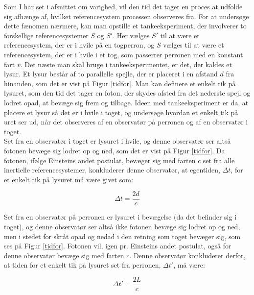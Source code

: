Som I har set i afsnittet om varighed, vil den tid det tager en proces at udfolde sig afhænge af, hvilket referencesystem processen observeres fra.
For at undersøge dette fænomen nærmere, kan man opstille et tankeeksperiment, der involverer to forskellige referencesystemer $S$ og $S'$. Her vælges $S'$ til at være et referencesystem, der er i hvile på en togperron, og $S$ vælges til at være et referencesystem, der er i hvile i et tog, som passerrer perronen med en konstant fart $v$. Det næste man skal bruge i tankeeksperimentet, er det, der kaldes et lysur. Et lysur består af to parallelle spejle, der er placeret i en afstand $d$ fra hinanden, som det er vist på Figur \ref{tidfor}. Man kan definere et enkelt tik på lysuret, som den tid det tager en foton, der skydes afsted fra det nederste spejl og lodret opad, at bevæge sig frem og tilbage. Ideen med tankeeksperiment er da, at placere et lysur så det er i hvile i toget, og undersøge hvordan et enkelt tik på uret ser ud, når det observeres af en observatør på perronen og af en observatør i toget.\\

Set fra en observatør i toget er lysuret i hvile, og denne observatør ser altså fotonen bevæge sig lodret op og ned, som det er vist på Figur \ref{tidfor}. Da fotonen, ifølge Einsteins andet postulat, bevæger sig med farten $c$ set fra alle inertielle referencesystemer, konkluderer denne observatør, at egentiden, $\Delta t$, for et enkelt tik på lysuret må være givet som:

\begin{equation}
\Delta t = \frac{2d}{c}
\label{tid_tog}
\end{equation}

\vspace{2mm}

Set fra en observatør på perronen er lysuret i bevægelse (da det befinder sig i toget), og denne observatør ser altså ikke fotonen bevæge sig lodret op og ned, men i stedet for skråt opad og nedad i den retning som toget bevæger sig, som ses på Figur \ref{tidfor}. Fotonen vil, igen pr. Einsteins andet postulat, også for denne observatør bevæge sig med farten $c$. Denne observatør konkluderer derfor, at tiden for et enkelt tik på lysuret set fra perronen, $\Delta t'$, må være:

\begin{equation}
\Delta t' = \frac{2L}{c}
\label{tid_perron}
\end{equation} 

\vspace{2mm}  

